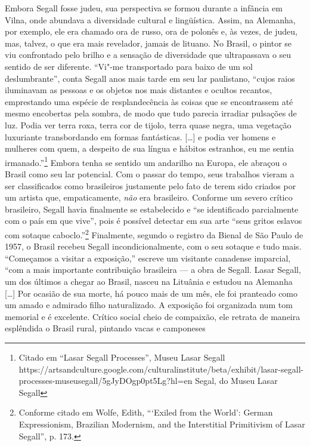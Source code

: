 Embora Segall fosse judeu, sua perspectiva se formou durante a infância
em Vilna, onde abundava a diversidade cultural e lingüística. Assim, na
Alemanha, por exemplo, ele era chamado ora de russo, ora de polonês e,
às vezes, de judeu, mas, talvez, o que era mais revelador, jamais de
lituano. No Brasil, o pintor se viu confrontado pelo brilho e a sensação
de diversidade que ultrapassava o seu sentido de ser diferente. ``Vi"-me
transportado para baixo de um sol deslumbrante'', conta Segall anos mais
tarde em seu lar paulistano, ``cujos raios iluminavam as pessoas e os
objetos nos mais distantes e ocultos recantos, emprestando uma espécie
de resplandecência às coisas que se encontrassem até mesmo encobertas
pela sombra, de modo que tudo parecia irradiar pulsações de luz. Podia
ver terra roxa, terra cor de tijolo, terra quase negra, uma vegetação
luxuriante transbordando em formas fantásticas. {[}\ldots{}{]} e podia
ver homens e mulheres com quem, a despeito de sua língua e hábitos
estranhos, eu me sentia irmanado.''\footnote{Citado em ``Lasar Segall
  Processes'', Museu Lasar Segall
  https://artsandculture.google.com/culturalinstitute/beta/exhibit/lasar-segall-processes-museusegall/5gJyDOgp0pt5Lg?hl=en
  Segal, do Museu Lasar Segall} Embora tenha se sentido um andarilho na
Europa, ele abraçou o Brasil como seu lar potencial. Com o passar do
tempo, seus trabalhos vieram a ser classificados como brasileiros
justamente pelo fato de terem sido criados por um artista que,
empaticamente, \emph{não} era brasileiro. Conforme um severo crítico
brasileiro, Segall havia finalmente se estabelecido e ``se identificado
parcialmente com o país em que vive'', pois é possível detectar em sua
arte ``seus gritos eslavos com sotaque caboclo.''\footnote{Conforme
  citado em Wolfe, Edith, ```Exiled from the World': German
  Expressionism, Brazilian Modernism, and the Interstitial Primitivism
  of Lasar Segall'', p. 173.} Finalmente, segundo o registro da Bienal
de São Paulo de 1957, o Brasil recebeu Segall incondicionalmente, com o
seu sotaque e tudo mais. ``Começamos a visitar a exposição,'' escreve um
visitante canadense imparcial, ``com a mais importante contribuição
brasileira --- a obra de Segall. Lasar Segall, um dos últimos a chegar ao
Brasil, nasceu na Lituânia e estudou na Alemanha {[}\ldots{}{]} Por
ocasião de sua morte, há pouco mais de um mês, ele foi pranteado como um
amado e admirado filho naturalizado. A exposição foi organizada num tom
memorial e é excelente. Crítico social cheio de compaixão, ele retrata
de maneira esplêndida o Brasil rural, pintando vacas e camponeses
